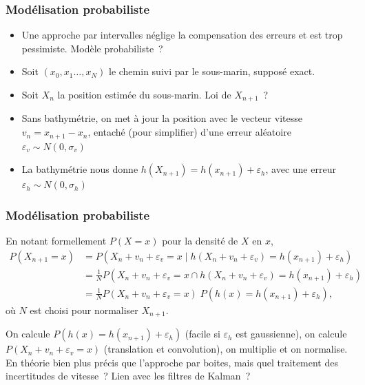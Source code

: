 \documentclass[11pt]{beamer}
\begin{document}
\begin{frame}
  \frametitle{Modélisation probabiliste}
  \begin{itemize}
  \item Une approche par intervalles néglige la compensation des erreurs
    et est trop pessimiste. Modèle probabiliste~?
  \item Soit $(x_{0}, x_{1} \dots, x_{N})$ le chemin suivi par le
    sous-marin, supposé exact.
  \item Soit $X_{n}$ la position estimée du sous-marin. Loi de
    $X_{n+1}$~?
  \item Sans bathymétrie, on met à jour la position avec le vecteur
    vitesse $v_{n} = x_{n+1} - x_{n}$, entaché (pour simplifier) d'une erreur aléatoire
    $\varepsilon_{v} \sim N(0, \sigma_{v})$
  \item La bathymétrie nous donne $h(X_{n+1}) = h(x_{n+1}) +
    \varepsilon_{h}$, avec une erreur $\varepsilon_{h} \sim N(0, \sigma_{h})$
  \end{itemize}

  \begin{center}
  \end{center}
\end{frame}
\begin{frame}
  \frametitle{Modélisation probabiliste}
  \begin{center}
  \end{center}

  En notant formellement $P(X=x)$ pour la densité de $X$ en $x$,
  \begin{align*}
    P(X_{n+1} = x) &= P(X_{n} + v_{n} + \varepsilon_{v} = x \;\Big|\;
    h(X_{n} + v_{n} + \varepsilon_{v}) = h(x_{n+1}) + 
                     \varepsilon_{h})\\
    &= \frac 1 N P(X_{n} + v_{n} + \varepsilon_{v} = x \cap
    h(X_{n} + v_{n} + \varepsilon_{v}) = h(x_{n+1}) + \varepsilon_{h})\\
    &= \frac 1 N P(X_{n} + v_{n} + \varepsilon_{v} = x) \; P(h(x) = h(x_{n+1}) + \varepsilon_{h}),
  \end{align*}
  où $N$ est choisi pour normaliser $X_{n+1}$.

  On calcule $P(h(x) = h(x_{n+1}) + \varepsilon_{h})$ (facile si
  $\varepsilon_{h}$ est gaussienne), on calcule $P(X_{n} + v_{n} +
  \varepsilon_{v} = x)$ (translation et convolution), on multiplie et on
  normalise. En théorie bien plus précis que l'approche par boites,
  mais quel traitement des incertitudes de vitesse~? Lien avec les
  filtres de Kalman~?
\end{frame}
\end{document}
